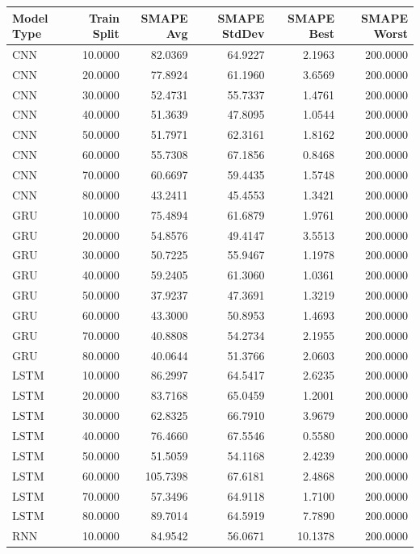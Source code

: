 \begin{tabular}{lrrrrr}
\toprule
Model Type & Train Split & SMAPE Avg & SMAPE StdDev & SMAPE Best & SMAPE Worst \\
\midrule
CNN & 10.0000 & 82.0369 & 64.9227 & 2.1963 & 200.0000 \\
CNN & 20.0000 & 77.8924 & 61.1960 & 3.6569 & 200.0000 \\
CNN & 30.0000 & 52.4731 & 55.7337 & 1.4761 & 200.0000 \\
CNN & 40.0000 & 51.3639 & 47.8095 & 1.0544 & 200.0000 \\
CNN & 50.0000 & 51.7971 & 62.3161 & 1.8162 & 200.0000 \\
CNN & 60.0000 & 55.7308 & 67.1856 & 0.8468 & 200.0000 \\
CNN & 70.0000 & 60.6697 & 59.4435 & 1.5748 & 200.0000 \\
CNN & 80.0000 & 43.2411 & 45.4553 & 1.3421 & 200.0000 \\
GRU & 10.0000 & 75.4894 & 61.6879 & 1.9761 & 200.0000 \\
GRU & 20.0000 & 54.8576 & 49.4147 & 3.5513 & 200.0000 \\
GRU & 30.0000 & 50.7225 & 55.9467 & 1.1978 & 200.0000 \\
GRU & 40.0000 & 59.2405 & 61.3060 & 1.0361 & 200.0000 \\
GRU & 50.0000 & 37.9237 & 47.3691 & 1.3219 & 200.0000 \\
GRU & 60.0000 & 43.3000 & 50.8953 & 1.4693 & 200.0000 \\
GRU & 70.0000 & 40.8808 & 54.2734 & 2.1955 & 200.0000 \\
GRU & 80.0000 & 40.0644 & 51.3766 & 2.0603 & 200.0000 \\
LSTM & 10.0000 & 86.2997 & 64.5417 & 2.6235 & 200.0000 \\
LSTM & 20.0000 & 83.7168 & 65.0459 & 1.2001 & 200.0000 \\
LSTM & 30.0000 & 62.8325 & 66.7910 & 3.9679 & 200.0000 \\
LSTM & 40.0000 & 76.4660 & 67.5546 & 0.5580 & 200.0000 \\
LSTM & 50.0000 & 51.5059 & 54.1168 & 2.4239 & 200.0000 \\
LSTM & 60.0000 & 105.7398 & 67.6181 & 2.4868 & 200.0000 \\
LSTM & 70.0000 & 57.3496 & 64.9118 & 1.7100 & 200.0000 \\
LSTM & 80.0000 & 89.7014 & 64.5919 & 7.7890 & 200.0000 \\
RNN & 10.0000 & 84.9542 & 56.0671 & 10.1378 & 200.0000 \\

\end{tabular}
